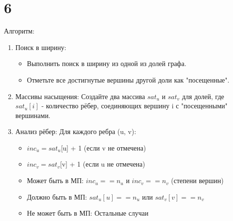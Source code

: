 \documentclass[12pt]{extarticle}
\begin{document}
\section*{6}
Алгоритм:
\begin{enumerate}
    \item  Поиск в ширину: \begin{itemize}
        \item Выполнить поиск в ширину из одной из долей графа.
        \item Отметьте все достигнутые вершины другой доли как "посещенные".
    \end{itemize}
    \item Массивы насыщения: Создайте два массива $sat_u$ и $sat_v$ для долей, где $sat_u[i]$ - количество рёбер, соединяющих вершину i с "посещенными" вершинами.
    \item Анализ рёбер: Для каждого ребра (u, v): \begin{itemize}
        \item $inc_u = sat_u$[u] + 1 (если v не отмечена)
        \item $inc_v = sat_v$[v] + 1 (если u не отмечена)
        \item Может быть в МП: $inc_u == n_u$ и $inc_v == n_v$ (степени вершин)
        \item Должно быть в МП: $sat_u[u] == n_u$ или $sat_v[v] == n_v$
        \item Не может быть в МП: Остальные случаи
    \end{itemize}
\end{enumerate}
    
\end{document}
